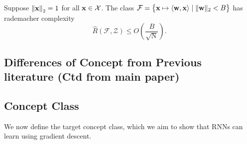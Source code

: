 \begin{fact}\label{fact:radcomp_linear}
	Suppose $\norm[0]{\mathbf{x}}_2 = 1$ for all $\mathbf{x} \in \mathcal{X}$. The class $\mathcal{F}=\left\{\mathbf{x} \mapsto\langle \mathbf{w}, \mathbf{x}\rangle \mid\|\mathbf{w}\|_{2}<B\right\}$ has rademacher complexity
	$$
	\widehat{R}(\mathcal{F}, \mathcal{Z}) \leq O\left(\frac{B}{\sqrt{\mathrm{N}}}\right).
	$$
\end{fact}




\iffalse
\subsection{Differences of Concept from Previous literature (Ctd from main paper)}

\subsection{Concept Class}
We now define the target concept class, which we aim to show that RNNs can learn using gradient descent. 


